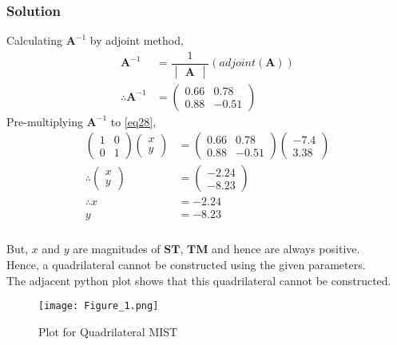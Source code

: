 \documentclass{beamer}
\theoremstyle{remark}
\renewcommand{\vec}[1]{\mathbf{#1}}
\newcommand{\myvec}[1]{\ensuremath{\begin{pmatrix}#1\end{pmatrix}}}
\newcommand{\mydet}[1]{\ensuremath{\begin{vmatrix}#1\end{vmatrix}}}
\begin{document}
\begin{frame}
    \frametitle{Solution}
    \begin{block}{}
        Calculating $\vec{A}^{-1}$ by adjoint method,
        \begin{align}
            \vec{A}^{-1} &= \dfrac{1}{\mydet{\vec{A}}}(adjoint(\vec{A}))\\
            \therefore \vec{A}^{-1} &= \myvec{0.66 & 0.78\\ 0.88 & -0.51}
        \end{align}
        Pre-multiplying $\vec{A}^{-1}$ to \eqref{eq28},
        \begin{align}
            \myvec{1 & 0\\0 & 1} \myvec{x\\y} &= \myvec{0.66 & 0.78\\ 0.88 & -0.51} \myvec{-7.4\\3.38}\\
            \therefore \myvec{x \\ y} &= \myvec{-2.24\\-8.23}\\
            \therefore x &= -2.24\\
            y &= -8.23
        \end{align}
    \end{block}
\end{frame}
\begin{frame}
    \frametitle{}
    \begin{block}{}
        But, $x$ and $y$ are magnitudes of $\vec{ST}$, $\vec{TM}$ and hence are always positive.\\
        Hence, a quadrilateral cannot be constructed using the given parameters.
        \\The adjacent python plot shows that this quadrilateral cannot be constructed.
        \begin{figure}
            \centering
            \texttt{[image: Figure\_1.png]}
        \caption{Plot for Quadrilateral MIST}
        \label{fig:my_label}
        \end{figure}
    \end{block}
\end{frame}
\end{document}
